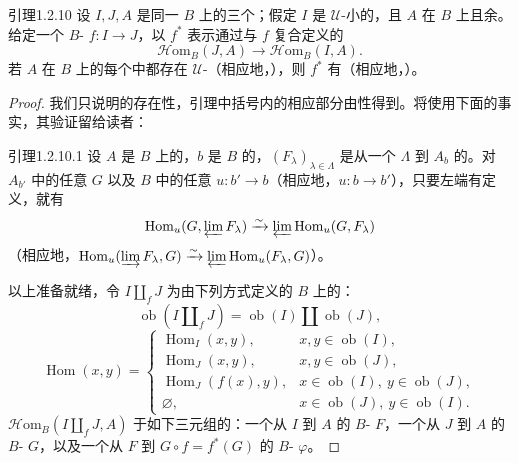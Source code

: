 \begin{SGAresult}{引理}{1.2.10}
设 $I,J,A$ 是同一 $B$ 上的三个；假定 $I$ 是 $\mathcal U$-小的，且 $A$ 在 $B$ 上且余。给定一个 $B$- $f:I\to J$，以 $f^*$ 表示通过与 $f$ 复合定义的
\[
\mathscr{H}\mathrm{om}_B(J,A)\longrightarrow\mathscr{H}\mathrm{om}_B(I,A).
\]
若 $A$ 在 $B$ 上的每个中都存在 $\mathcal U$-（相应地，），则 $f^*$ 有（相应地，）。
\end{SGAresult}
\begin{proof}
我们只说明的存在性，引理中括号内的相应部分由性得到。将使用下面的事实，其验证留给读者：
\begin{SGAresult}{引理}{1.2.10.1}
设 $A$ 是 $B$ 上的，$b$ 是 $B$ 的，$(F_\lambda)_{\lambda\in\Lambda}$ 是从一个 $\Lambda$ 到 $A_b$ 的。对 $A_{b'}$ 中的任意 $G$ 以及 $B$ 中的任意 $u:b'\to b$（相应地，$u:b\to b'$），只要左端有定义，就有
\[
\operatorname{Hom}_u(G,\varprojlim F_\lambda)\xrightarrow{\sim}\varprojlim\operatorname{Hom}_u(G,F_\lambda)
\]
（相应地，$\operatorname{Hom}_u(\varinjlim F_\lambda,G)\xrightarrow{\sim}\varprojlim\operatorname{Hom}_u(F_\lambda,G)$）。
\end{SGAresult}
以上准备就绪，令 $I\amalg_fJ$ 为由下列方式定义的 $B$ 上的：
\[
\operatorname{ob}(I\amalg_fJ)=\operatorname{ob}(I)\amalg\operatorname{ob}(J),
\]
\[
\operatorname{Hom}(x,y)=
\begin{cases}
\operatorname{Hom}_I(x,y),&x,y\in\operatorname{ob}(I),\\
\operatorname{Hom}_J(x,y),&x,y\in\operatorname{ob}(J),\\
\operatorname{Hom}_J(f(x),y),&x\in\operatorname{ob}(I),\ y\in\operatorname{ob}(J),\\
\varnothing,&x\in\operatorname{ob}(J),\ y\in\operatorname{ob}(I).
\end{cases}
\]
 $\mathscr{H}\mathrm{om}_B(I\amalg_fJ,A)$ 于如下三元组的：一个从 $I$ 到 $A$ 的 $B$- $F$，一个从 $J$ 到 $A$ 的 $B$- $G$，以及一个从 $F$ 到 $G\circ f=f^*(G)$ 的 $B$- $\varphi$。


\end{proof}
